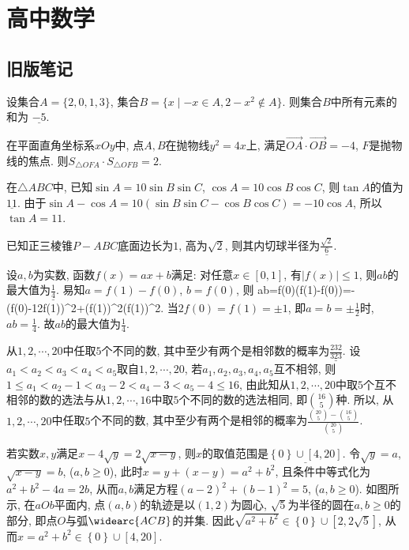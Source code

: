 \chapter{高中数学}


\section{旧版笔记}

\bq{}{}
设集合$A=\{2,0,1,3\}$, 集合$B=\{x\mid -x\in A, 2-x^2\notin A\}$. 则集合$B$中所有元素的和为 $\underline{-5}$.
\eq

\bq{}{}
在平面直角坐标系$xOy$中, 点$A,B$在抛物线$y^2=4x$上, 满足$\overrightarrow{OA}\cdot\overrightarrow{OB}=-4$, $F$是抛物线的焦点. 则$S_{\triangle OFA}\cdot S_{\triangle OFB}=2$.
\eq

\bq{}{}
在$\triangle ABC$中, 已知$\sin A=10\sin B\sin C$, $\cos A=10\cos B\cos C$, 则$\tan A$的值为$\underline{11}$.
\eq
\ba
由于$\sin A-\cos A=10(\sin B\sin C-\cos B\cos C)=-10\cos A$, 所以$\tan A=11$.
\ea

\bq{}{}
已知正三棱锥$P-ABC$底面边长为$1$, 高为$\sqrt{2}$, 则其内切球半径为$\underline{\frac{\sqrt{2}}{6}}$.
\eq

\bq{}{}
设$a,b$为实数, 函数$f(x)=ax+b$满足: 对任意$x\in[0,1]$, 有$|f(x)|\le 1$, 则$ab$的最大值为$\underline{\frac14}$.
\eq
\ba
易知$a=f(1)-f(0)$, $b=f(0)$, 则
\bee
ab=f(0)\cdot(f(1)-f(0))=-\left(f(0)-\frac12f(1)\right)^{2}+(f(1))^2\le{}(f(1))^2\le{}.
\eee
当$2f(0)=f(1)=\pm1$, 即$a=b=\pm\frac12$时, $ab=\frac14$. 故$ab$的最大值为$\frac14$.
\ea

\bq{}{}
从$1,2,\cdots,20$中任取$5$个不同的数, 其中至少有两个是相邻数的概率为$\underline{\frac{232}{323}}$.
\eq
\ba
设$a_1<a_2<a_3<a_4<a_5$取自$1,2,\cdots,20$, 若$a_1,a_2,a_3,a_4,a_5$互不相邻, 则$1\le a_1 <a_2-1<a_3-2<a_4-3<a_5-4\le 16$, 
由此知从$1,2,\cdots,20$中取$5$个互不相邻的数的选法与从$1,2,\cdots,16$中取$5$个不同的数的选法相同, 即$\binom{16}{5}$种. 
所以, 从$1,2,\cdots,20$中任取$5$个不同的数, 
其中至少有两个是相邻的概率为$\frac{\binom{20}{5}-\binom{16}{5}}{\binom{20}{5}}$.
\ea

\bq{}{}
若实数$x,y$满足$x-4\sqrt{y}=2\sqrt{x-y}$, 则$x$的取值范围是$\underline{\left\{ 0\right\} \cup\left[4,20\right]}$.
\eq
\ba
令$\sqrt{y}=a$, $\sqrt{x-y}=b$, ($a,b\ge0$), 此时$x=y+(x-y)=a^{2}+b^{2}$,
且条件中等式化为$a^{2}+b^{2}-4a=2b$, 从而$a,b$满足方程$(a-2)^{2}+(b-1)^{2}=5$,
($a,b\ge0$). 如图所示, 在$aOb$平面内, 点$(a,b)$的轨迹是以$(1,2)$为圆心, $\sqrt{5}$为半径的圆在$a,b\ge0$的部分,
即点$O$与弧$\widearc{ACB}$的并集. 因此$\sqrt{a^{2}+b^{2}}\in\left\{ 0\right\} \cup\left[2,2\sqrt{5}\right]$,
从而$x=a^{2}+b^{2}\in\left\{ 0\right\} \cup\left[4,20\right]$.

